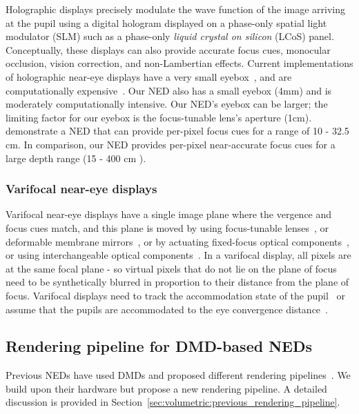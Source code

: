 Holographic displays precisely modulate the wave function of the image arriving at the pupil using a digital hologram displayed on a phase-only spatial light modulator (SLM) such as a phase-only \emph{liquid crystal on silicon} (LCoS) panel. Conceptually, these displays can also provide accurate focus cues, monocular occlusion, vision correction, and non-Lambertian effects. Current implementations of holographic near-eye displays have a very small eyebox~\cite{Maimone2017Holographic}, and are computationally expensive~\cite{Shi2017Near,Maimone2017Holographic,Matsuda2017focal}. Our NED also has a small eyebox (4mm) and is moderately computationally intensive. Our NED's eyebox can be larger; the limiting factor for our eyebox is the focus-tunable lens's aperture (1cm). \citet{Maimone2017Holographic} demonstrate a NED that can provide per-pixel focus cues for a range of 10 - 32.5 cm. In comparison, our NED provides per-pixel near-accurate focus cues for a large depth range (15 - 400 cm ).

\subsubsection{Varifocal near-eye displays}
\label{sec:volumetric:varifocal_displays}
Varifocal near-eye displays have a single image plane where the vergence and focus cues match, and this plane is moved by using focus-tunable lenses~\cite{Padmanaban2016Optimizing,Liu2008Optical,Konrad2016Novel,xia2019towards}, or deformable membrane mirrors~\cite{Dunn2017Wide}, or by actuating fixed-focus optical components~\cite{Aksit2017Near}, or using interchangeable optical components~\cite{rathinavel2018steerable,akcsit2019manufacturing}. In a varifocal display, all pixels are at the same focal plane - so virtual pixels that do not lie on the plane of focus need to be synthetically blurred in proportion to their distance from the plane of focus. Varifocal displays need to track the accommodation state of the pupil~\cite{Padmanaban2016Optimizing} or assume that the pupils are accommodated to the eye convergence distance~\cite{Dunn2017Wide,Aksit2017Near}. 

\subsection{Rendering pipeline for DMD-based NEDs}
Previous NEDs have used DMDs and proposed different rendering pipelines~\cite{Lincoln2016motion,Lincoln2017scene,Hu2014design,Hu2015Design}. We build upon their hardware but propose a new rendering pipeline. A detailed discussion is provided in Section~\ref{sec:volumetric:previous_rendering_pipeline}.

